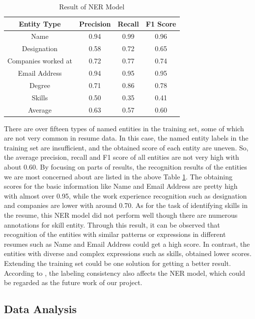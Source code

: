 \begin{table}[htbp]
\centering
\begin{tabular}{|c|c|c|c|}
\hline
Entity Type & Precision & Recall & F1 Score\\
\hline
Name & 0.94 & 0.99 & 0.96\\
\hline
Designation & 0.58 & 0.72 & 0.65\\
\hline
Companies worked at & 0.72 & 0.77 & 0.74\\
\hline
Email Address & 0.94 & 0.95 & 0.95\\
\hline
Degree & 0.71 & 0.86 & 0.78\\
\hline
Skills & 0.50 & 0.35 & 0.41\\
\hline
Average & 0.63 & 0.57 & 0.60\\
\hline
\end{tabular}
\caption{Result of NER Model}
\label{tbl:4}
\end{table}


There are over fifteen types of named entities in the training set, some of which are not very common in resume data. In this case, the named entity labels in the training set are insufficient, and the obtained score of each entity are uneven. So, the average precision, recall and F1 score of all entities are not very high with about 0.60. By focusing on parts of results, the recognition results of the entities we are most concerned about are listed in the above Table \ref{tbl:4}. The obtaining scores for the basic information like Name and Email Address are pretty high with almost over 0.95, while the work experience recognition such as designation and companies are lower with around 0.70. As for the task of identifying skills in the resume, this NER model did not perform well though there are numerous annotations for skill entity. Through this result, it can be observed that recognition of the entities with similar patterns or expressions in different resumes such as Name and Email Address could get a high score. In contrast, the entities with diverse and complex expressions such as skills, obtained lower scores. Extending the training set could be one solution for getting a better result. According to \cite{fu2020interpretable}, the labeling consistency also affects the NER model, which could be regarded as the future work of our project.



\subsection{Data Analysis}

